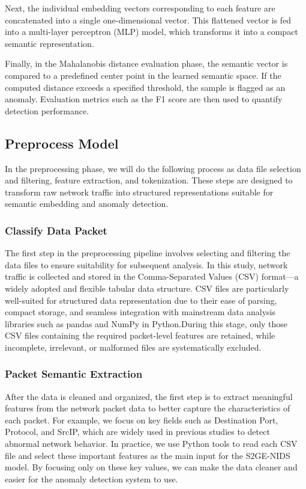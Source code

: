 \begin{ZhChapter}
    Next, the individual embedding vectors corresponding to each feature are concatenated into a single one-dimensional vector. This flattened vector is fed into a multi-layer perceptron (MLP) model, which transforms it into a compact semantic representation.

    Finally, in the Mahalanobis distance evaluation phase, the semantic vector is compared to a predefined center point in the learned semantic space. If the computed distance exceeds a specified threshold, the sample is flagged as an anomaly. Evaluation metrics such as the F1 score are then used to quantify detection performance.

    \subsection{Preprocess Model}
    In the preprocessing phase, we will do the following process as data file selection and filtering, feature extraction, and tokenization. These steps are designed to transform raw network traffic into structured representations suitable for semantic embedding and anomaly detection.

    \subsubsection{Classify Data Packet}

    The first step in the preprocessing pipeline involves selecting and filtering the data files to ensure suitability for subsequent analysis. In this study, network traffic is collected and stored in the Comma-Separated Values (CSV) format—a widely adopted and flexible tabular data structure. CSV files are particularly well-suited for structured data representation due to their ease of parsing, compact storage, and seamless integration with mainstream data analysis libraries such as pandas and NumPy in Python.During this stage, only those CSV files containing the required packet-level features are retained, while incomplete, irrelevant, or malformed files are systematically excluded.

    \subsubsection{Packet Semantic Extraction}

    After the data is cleaned and organized, the first step is to extract meaningful features from the network packet data to better capture the characteristics of each packet. For example, we focus on key fields such as Destination Port, Protocol, and SrcIP, which are widely used in previous studies to detect abnormal network behavior.
    In practice, we use Python tools to read each CSV file and select these important features as the main input for the S2GE-NIDS model. By focusing only on these key values, we can make the data cleaner and easier for the anomaly detection system to use.


\end{ZhChapter}
